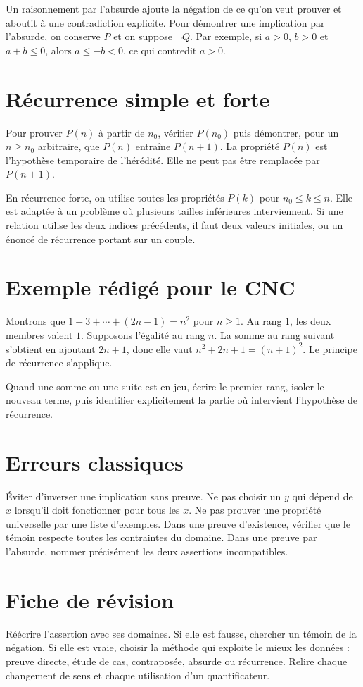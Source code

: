 \documentclass[11pt,a4paper]{article}
\begin{document}
Un raisonnement par l’absurde ajoute la négation de ce qu’on veut prouver et aboutit à une contradiction explicite. Pour démontrer une implication par l’absurde, on conserve $P$ et on suppose $\neg Q$. Par exemple, si $a>0$, $b>0$ et $a+b\le0$, alors $a\le-b<0$, ce qui contredit $a>0$.

\section*{Récurrence simple et forte}
Pour prouver $P(n)$ à partir de $n_0$, vérifier $P(n_0)$ puis démontrer, pour un $n\ge n_0$ arbitraire, que $P(n)$ entraîne $P(n+1)$. La propriété $P(n)$ est l’hypothèse temporaire de l’hérédité. Elle ne peut pas être remplacée par $P(n+1)$.

En récurrence forte, on utilise toutes les propriétés $P(k)$ pour $n_0\le k\le n$. Elle est adaptée à un problème où plusieurs tailles inférieures interviennent. Si une relation utilise les deux indices précédents, il faut deux valeurs initiales, ou un énoncé de récurrence portant sur un couple.

\section*{Exemple rédigé pour le CNC}
Montrons que $1+3+\cdots+(2n-1)=n^2$ pour $n\ge1$. Au rang $1$, les deux membres valent $1$. Supposons l’égalité au rang $n$. La somme au rang suivant s’obtient en ajoutant $2n+1$, donc elle vaut $n^2+2n+1=(n+1)^2$. Le principe de récurrence s’applique.

Quand une somme ou une suite est en jeu, écrire le premier rang, isoler le nouveau terme, puis identifier explicitement la partie où intervient l’hypothèse de récurrence.

\section*{Erreurs classiques}
Éviter d’inverser une implication sans preuve. Ne pas choisir un $y$ qui dépend de $x$ lorsqu’il doit fonctionner pour tous les $x$. Ne pas prouver une propriété universelle par une liste d’exemples. Dans une preuve d’existence, vérifier que le témoin respecte toutes les contraintes du domaine. Dans une preuve par l’absurde, nommer précisément les deux assertions incompatibles.

\section*{Fiche de révision}
Réécrire l’assertion avec ses domaines. Si elle est fausse, chercher un témoin de la négation. Si elle est vraie, choisir la méthode qui exploite le mieux les données : preuve directe, étude de cas, contraposée, absurde ou récurrence. Relire chaque changement de sens et chaque utilisation d’un quantificateur.
\end{document}
